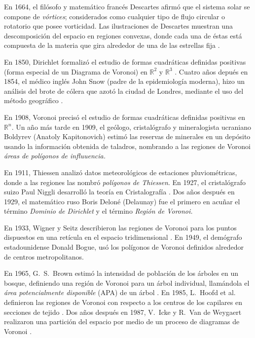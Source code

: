 En 1664, el filósofo y matemático francés Descartes afirmó que el sistema solar se compone de \textit{vórtices}; considerados como cualquier tipo de flujo circular o rotatorio que posee vorticidad. Las ilustraciones de Descartes muestran una descomposición del espacio en regiones convexas, donde cada una de éstas está compuesta de la materia que gira alrededor de una de las estrellas fija \citep{aurenhammer}.

En 1850, Dirichlet formalizó el estudio de formas cuadráticas definidas positivas (forma especial de un Diagrama de Voronoi) en $\mathbb{R}^{2}$ y $\mathbb{R}^{3}$ \citep{dirichlet}. Cuatro años depués en 1854, el médico inglés John Snow (padre de la epidemiología moderna), hizo un análisis del brote de cólera que azotó la ciudad de Londres, mediante el uso del método geográfico \citep{doval}.

En 1908, Voronoi precisó el estudio de formas cuadráticas definidas positivas en $\mathbb{R}^{n}$. Un año más tarde en 1909, el geólogo, cristalógrafo y mineralogista ucraniano Boldyrev (Anatoly Kapitonovich) estimó las reservas de minerales en un depósito usando la información obtenida de taladros, nombrando a las regiones de Voronoi \textit{áreas de polígonos de influuencia.}

En 1911, Thiessen analizó datos meteorológicos de estaciones pluviométricas, donde a las regiones las nombró \textit{polígonos de Thiessen}. En 1927, el cristalógrafo suizo Paul Niggli desarrolló la teoría en Cristalografía \citep{manzoor}. Dos años después en 1929, el matemático ruso Boris Deloné (Delaunay) fue el primero en acuñar el término \textit{Dominio de Dirichlet} y el término \textit{Región de Voronoi.}

En 1933,  Wigner y Seitz describieron las regiones de Voronoi para los puntos dispuestos en una retícula en el espacio tridimensional \citep{okabe}. En 1949, el demógrafo estadounidense Donald Bogue, usó los polígonos de Voronoi definidos alrededor de centros metropolitanos.

En 1965, G.\ S.\ Brown estimó la intensidad de población de los árboles en un bosque, definiendo una región de Voronoi para un árbol individual, llamándola el \textit{área potencialmente disponible} (APA) de un árbol \citep{brown}. En 1985, L.\ Hoofd et al. definieron las regiones de Voronoi con respecto a los centros de los capilares en secciones de tejido \citep{turek}. Dos años después en 1987, V.\ Icke y R.\ Van de Weygaert realizaron una partición del espacio por medio de un proceso de diagramas de Voronoi \citep{icke}.



